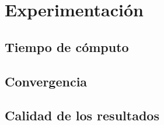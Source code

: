 \section{Experimentación}

	\subsection{Tiempo de cómputo}

	\subsection{Convergencia}

	\subsection{Calidad de los resultados}

